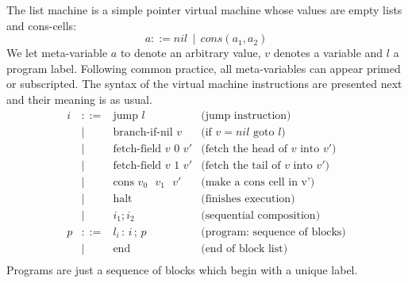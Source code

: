 \documentclass[sigconf]{acmart}
\theoremstyle{definition}
\begin{document}
The list machine is a simple pointer virtual machine whose values
are empty lists and cons-cells:
\[
a ::= nil\,\mid\,cons(a_1,a_2)
\]
We let meta-variable $a$ to denote an arbitrary value, $v$ denotes a variable
and $l$ a program label. Following common practice, all meta-variables can
appear primed or subscripted. The syntax of the virtual machine instructions are
presented next and their meaning is as usual.
\[
\begin{array}{rcll}
  i & ::=  & \text{jump }l                       & \text{(jump instruction)}\\
    & \mid & \text{branch-if-nil $v$}            & \text{(if $v = nil$ goto $l$)}\\
    & \mid & \text{fetch-field $v$ 0 $v'$}       & \text{(fetch the head of $v$ into $v'$)}\\
    & \mid & \text{fetch-field  $v$ 1 $v'$}      & \text{(fetch the tail of $v$ into $v'$)}\\
    & \mid & \text{cons $v_0$ $v_1$ $v'$}        & \text{(make a cons cell in v')} \\
    & \mid & \text{halt}                         & \text{(finishes execution)}\\
    & \mid & i_1;i_2                             & \text{(sequential composition)}\\
  p & ::=  & l_i \,:\,i\,;\,p                    & \text{(program: sequence of blocks)}\\
    & \mid & \text{end}                          & \text{(end of block list)}\\
\end{array}
\]
Programs are just a sequence of blocks which begin with a unique label. 
\end{document}
